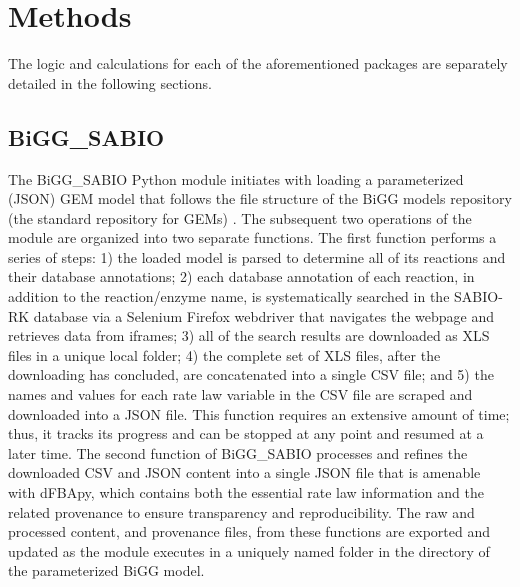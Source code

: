 \section*{Methods}
The logic and calculations for each of the aforementioned packages are separately detailed in the following sections.

\subsection*{BiGG\_SABIO}

The BiGG\_SABIO Python module initiates with loading a parameterized (JSON) GEM model that follows the file structure of the BiGG models repository (the standard repository for GEMs) \cite{King2016BiGGModels}. The subsequent two operations of the module are organized into two separate functions. The first function  performs a series of steps: 1) the loaded model is parsed to determine all of its reactions and their database annotations; 2) each database annotation of each reaction, in addition to the reaction/enzyme name, is systematically searched in the SABIO-RK database via a Selenium Firefox webdriver \cite{vandenBroucke2018PracticalScience,Nyamathulla2021APython} that navigates the webpage and retrieves data from iframes; 3) all of the search results are downloaded as XLS files in a unique local folder; 4) the complete set of XLS files, after the downloading has concluded, are concatenated into a single CSV file; and 5) the names and values for each rate law variable in the CSV file are scraped and downloaded into a JSON file. This function requires an extensive amount of time; thus, it tracks its progress and can be stopped at any point and resumed at a later time. The second function of BiGG\_SABIO  processes and refines the downloaded CSV and JSON content into a single JSON file that is amenable with dFBApy, which contains both the essential rate law information and the related provenance to ensure transparency and reproducibility. The raw and processed content, and provenance files, from these functions are exported and updated as the module executes in a uniquely named folder in the directory of the parameterized BiGG model. 

